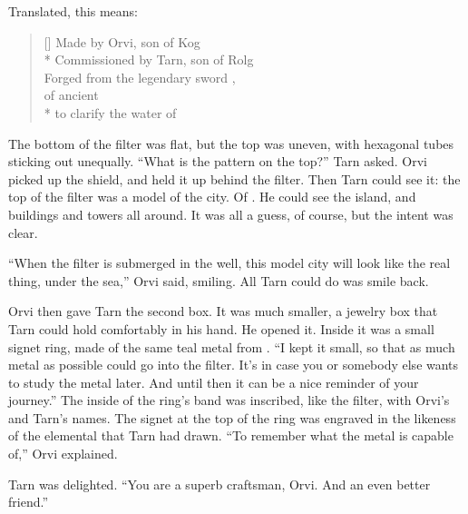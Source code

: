 
Translated, this means:

\settowidth{\versewidth}{Commissioned by Tarn, son of Rolg}
\begin{verse}[\versewidth]
Made by Orvi, son of Kog\\*
Commissioned by Tarn, son of Rolg\\
Forged from the legendary sword \kildir,\\
of ancient \valdunmir\\*
to clarify the water of \korbarthrond
\end{verse}

The bottom of the filter was flat, but the top was uneven, with hexagonal tubes sticking out unequally.  ``What is the pattern on the top?'' Tarn asked.  Orvi picked up the shield, and held it up behind the filter.  Then Tarn could see it:  the top of the filter was a model of the city.  Of \valdunmir.  He could see the island, and buildings and towers all around.  It was all a guess, of course, but the intent was clear.

``When the filter is submerged in the well, this model city will look like the real thing, under the sea,'' Orvi said, smiling.  All Tarn could do was smile back.

Orvi then gave Tarn the second box.  It was much smaller, a jewelry box that Tarn could hold comfortably in his hand.  He opened it.  Inside it was a small signet ring, made of the same teal metal from \kildir.  ``I kept it small, so that as much metal as possible could go into the filter.  It's in case you or somebody else wants to study the metal later.  And until then it can be a nice reminder of your journey.''  The inside of the ring's band was inscribed, like the filter, with Orvi's and Tarn's names.  The signet at the top of the ring was engraved in the likeness of the elemental that Tarn had drawn.  ``To remember what the metal is capable of,'' Orvi explained.

Tarn was delighted.  ``You are a superb craftsman, Orvi.  And an even better friend.''
